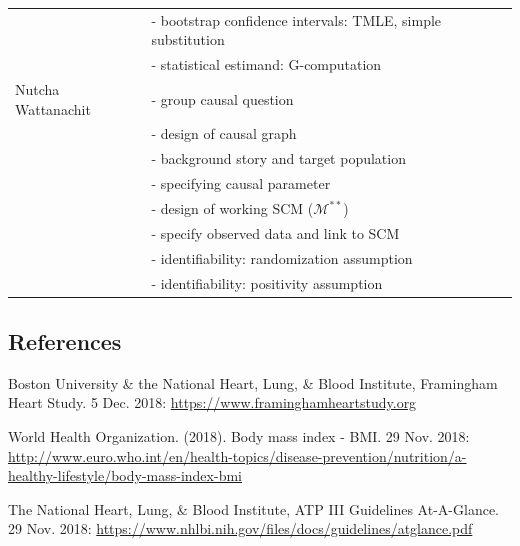 \documentclass[]{article}
\begin{document}
\begin{table}[h!]
\begin{tabular}{|l|l|}
      & - bootstrap confidence intervals: TMLE, simple substitution\\ 
      & - statistical estimand: G-computation \\ \hline
    Nutcha Wattanachit & - group causal question \\
      & - design of causal graph \\
      & - background story and target population \\
      & - specifying causal parameter \\
      & - design of working SCM ($\mathcal{M}^{**}$) \\
      & - specify observed data and link to SCM \\
      & - identifiability: randomization assumption \\
      & - identifiability: positivity assumption \\ \hline
  \end{tabular}
\end{table}

\subsection{References}\label{references}

Boston University \& the National Heart, Lung, \& Blood Institute,
Framingham Heart Study. 5 Dec. 2018:
\url{https://www.framinghamheartstudy.org}

World Health Organization. (2018). Body mass index - BMI. 29 Nov. 2018:
\url{http://www.euro.who.int/en/health-topics/disease-prevention/nutrition/a-healthy-lifestyle/body-mass-index-bmi}

The National Heart, Lung, \& Blood Institute, ATP III Guidelines
At-A-Glance. 29 Nov. 2018:
\url{https://www.nhlbi.nih.gov/files/docs/guidelines/atglance.pdf}
\end{document}
